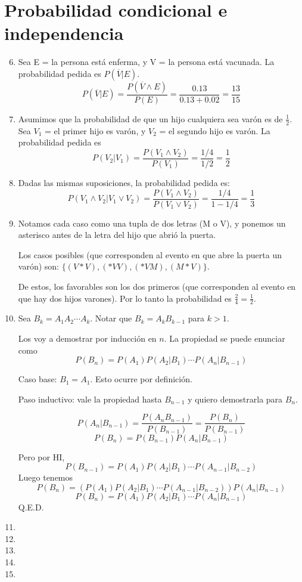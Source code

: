 \section{Probabilidad condicional e independencia}
\begin{enumerate}
	\setcounter{enumi}{5}
	\item
		Sea E = la persona está enferma, y V = la persona está vacunada.
		La probabilidad pedida es $P(\overline V | E)$.
		$$P(\overline V | E) = \frac{P(\overline V \land E)}{P(E)} = \frac{0.13}{0.13+0.02} = \frac{13}{15}$$
	\item
		Asumimos que la probabilidad de que un hijo cualquiera sea varón es de $\frac{1}{2}$.
		Sea $V_1$ = el primer hijo es varón, y $V_2$ = el segundo hijo es varón.
		La probabilidad pedida es
		$$P(V_2|V_1) = \frac{P(V_1 \land V_2)}{P(V_1)} = \frac{1/4}{1/2} = \frac{1}{2}$$
	\item
		Dadas las mismas suposiciones, la probabilidad pedida es:
		$$P(V_1 \land V_2|V_1 \lor V_2) = \frac{P(V_1 \land V_2)}{P(V_1 \lor V_2)} = \frac{1/4}{1-1/4} = \frac{1}{3}$$
	\item
		Notamos cada caso como una tupla de dos letras (M o V), y ponemos un asterisco antes de la letra del hijo que abrió la puerta.
		
		Los casos posibles (que corresponden al evento en que abre la puerta un varón) son: $\{(V*V), (*VV), (*VM), (M*V)\}$.
		
		De estos, los favorables son los dos primeros (que corresponden al evento en que hay dos hijos varones). Por lo tanto la probabilidad es $\frac{2}{4} = \frac{1}{2}$.
	\item
		Sea $B_k = A_1A_2\cdots A_k$. Notar que $B_k = A_k B_{k-1}$ para $k>1$.
		
		Los voy a demostrar por inducción en $n$. La propiedad se puede enunciar como $$P(B_n) = P(A_1) P(A_2|B_1) \cdots P(A_n|B_{n-1})$$
		
		Caso base: $B_1 = A_1$. Esto ocurre por definición.
		
		Paso inductivo: vale la propiedad hasta $B_{n-1}$ y quiero demostrarla para $B_n$.
		
		$$P(A_n | B_{n-1}) = \frac{P(A_n B_{n-1})}{P(B_{n-1})} = \frac{P(B_n)}{P(B_{n-1})}$$
		$$P(B_n) = P(B_{n-1}) P(A_n | B_{n-1})$$
		
		Pero por HI, $$P(B_{n-1}) = P(A_1) P(A_2|B_1) \cdots P(A_{n-1}|B_{n-2})$$
		Luego tenemos
		$$P(B_n) = (P(A_1) P(A_2|B_1) \cdots P(A_{n-1}|B_{n-2})) P(A_n | B_{n-1})$$
		$$P(B_n) = P(A_1) P(A_2|B_1) \cdots P(A_n|B_{n-1})$$
		Q.E.D.
	\item
	\item
	\item
	\item
	\item
\end{enumerate}

